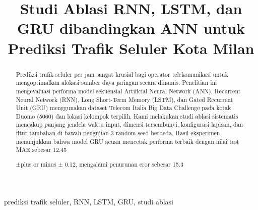 \documentclass[conference,a4paper]{IEEEtran}
\begin{document}
 

\title{Studi Ablasi RNN, LSTM, dan GRU dibandingkan ANN untuk Prediksi Trafik Seluler Kota Milan} 

\author{   \and {}  \and {}  }
\maketitle 

\begin{abstract}
Prediksi trafik seluler per jam sangat krusial bagi operator telekomunikasi untuk mengoptimalkan alokasi sumber daya jaringan secara dinamis. Penelitian ini mengevaluasi performa model sekuensial Artificial Neural Network (ANN), Recurrent Neural Network (RNN), Long Short-Term Memory (LSTM), dan Gated Recurrent Unit (GRU) menggunakan dataset Telecom Italia Big Data Challenge pada kotak Duomo (5060) dan lokasi kelompok terpilih. Kami melakukan studi ablasi sistematis mencakup panjang jendela waktu input, dimensi tersembunyi, konfigurasi lapisan, dan fitur tambahan di bawah pengujian 3 random seed berbeda. Hasil eksperimen menunjukkan bahwa model GRU acuan mencetak performa terbaik dengan nilai test MAE sebesar 12.45 

±plus or minus
±
 0.12, mengalami penurunan eror sebesar 15.3%
\end{abstract} 

\begin{IEEEkeywords} prediksi trafik seluler, RNN, LSTM, GRU, studi ablasi \end{IEEEkeywords} 
\end{document}
